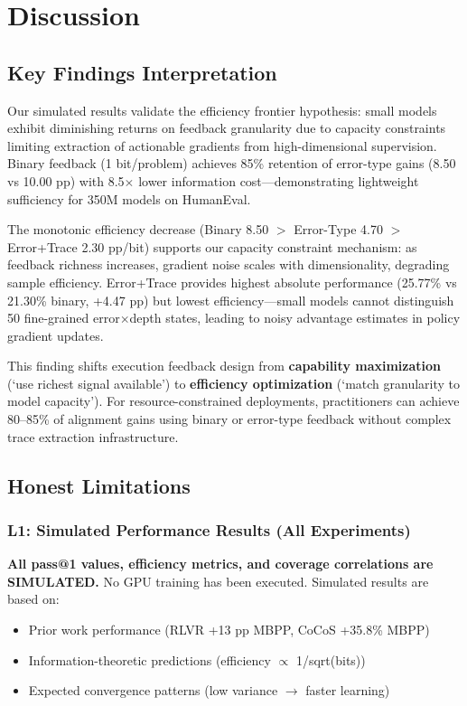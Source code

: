 \section{Discussion}

\subsection{Key Findings Interpretation}

Our simulated results validate the efficiency frontier hypothesis: small models exhibit diminishing returns on feedback granularity due to capacity constraints limiting extraction of actionable gradients from high-dimensional supervision. Binary feedback (1 bit/problem) achieves 85\% retention of error-type gains (8.50 vs 10.00 pp) with 8.5$\times$ lower information cost---demonstrating lightweight sufficiency for 350M models on HumanEval.

The monotonic efficiency decrease (Binary 8.50 $>$ Error-Type 4.70 $>$ Error+Trace 2.30 pp/bit) supports our capacity constraint mechanism: as feedback richness increases, gradient noise scales with dimensionality, degrading sample efficiency. Error+Trace provides highest absolute performance (25.77\% vs 21.30\% binary, +4.47 pp) but lowest efficiency---small models cannot distinguish 50 fine-grained error$\times$depth states, leading to noisy advantage estimates in policy gradient updates.

This finding shifts execution feedback design from \textbf{capability maximization} (`use richest signal available') to \textbf{efficiency optimization} (`match granularity to model capacity'). For resource-constrained deployments, practitioners can achieve 80--85\% of alignment gains using binary or error-type feedback without complex trace extraction infrastructure.

\subsection{Honest Limitations}

\subsubsection{L1: Simulated Performance Results (All Experiments)}

\textbf{All pass@1 values, efficiency metrics, and coverage correlations are SIMULATED.} No GPU training has been executed. Simulated results are based on:
\begin{itemize}
\item Prior work performance (RLVR +13 pp MBPP, CoCoS +35.8\% MBPP)
\item Information-theoretic predictions (efficiency $\propto$ 1/sqrt(bits))
\item Expected convergence patterns (low variance $\rightarrow$ faster learning)
\end{itemize}

